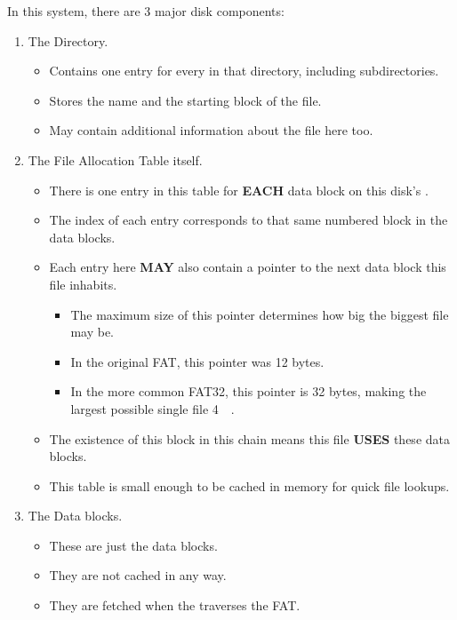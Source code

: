In this system, there are 3 major disk components:
\begin{enumerate}[noitemsep]
\item The Directory.
  \begin{itemize}[noitemsep]
  \item Contains one entry for every  in that directory, including subdirectories.
  \item Stores the name and the starting block of the file.
  \item May contain additional information about the file here too.
  \end{itemize}
\item The File Allocation Table itself.
  \begin{itemize}[noitemsep]
  \item There is one entry in this table for \textbf{EACH} data block on this disk's .
  \item The index of each entry corresponds to that same numbered block in the data blocks.
  \item Each entry here \textbf{MAY} also contain a pointer to the next data block this file inhabits.
    \begin{itemize}[noitemsep]
    \item The maximum size of this pointer determines how big the biggest file may be.
    \item In the original FAT, this pointer was 12 bytes.
    \item In the more common FAT32, this pointer is 32 bytes, making the largest possible single file \SI{4}{\gibi{} \byte{}}.
    \end{itemize}
  \item The existence of this block in this chain means this file \textbf{USES} these data blocks.
  \item This table is small enough to be cached in memory for quick file lookups.
  \end{itemize}
\item The Data blocks.
  \begin{itemize}[noitemsep]
  \item These are just the data blocks.
  \item They are not cached in any way.
  \item They are fetched when the  traverses the FAT.\@
  \end{itemize}
\end{enumerate}

